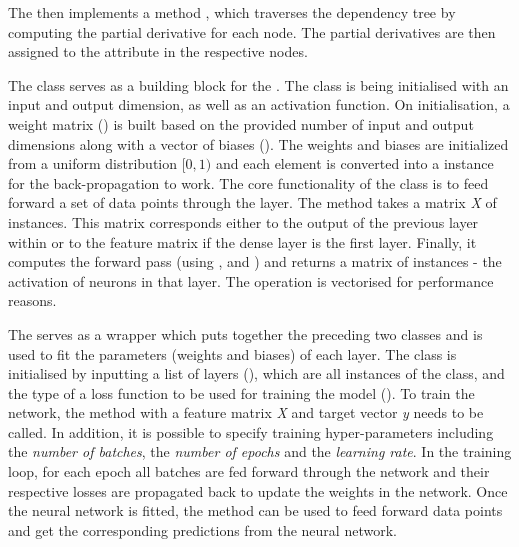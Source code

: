 The  then implements a method , which traverses the dependency tree by computing the partial derivative for each node. The partial derivatives are then assigned to the attribute  in the respective nodes.
\newline

The  class serves as a building block for the . The class is being initialised with an input and output dimension, as well as an activation function. On initialisation, a weight matrix () is built  based on the provided number of input and output dimensions along with a vector of biases (). The weights and biases are initialized from a uniform distribution $[0,1)$ and each element is converted into a  instance for the back-propagation to work. The core functionality of the  class is to feed forward a set of data points through the layer. The  method takes a matrix \textit{X} of  instances. This matrix corresponds either to the output of the previous layer within  or to the feature matrix if the dense layer is the first layer. Finally, it computes the forward pass (using ,  and ) and returns a matrix of  instances - the activation of neurons in that layer. The operation is vectorised for performance reasons.
\newline

The  serves as a wrapper which puts together the preceding two classes and is used to fit the parameters (weights and biases) of each layer. The class is initialised by inputting a list of layers (), which are all instances of the   class, and the type of a loss function to be used for training the model (). To train the network, the method  with a feature matrix \textit{X} and target vector \textit{y} needs to be called. In addition, it is possible to specify training hyper-parameters including the \textit{number of batches}, the \textit{number of epochs} and the \textit{learning rate}.  In the training loop, for each epoch all batches are fed forward through the network and their respective losses are propagated back to update the weights in the network. 
Once the neural network is fitted, the  method can be used to feed forward data points and get the corresponding predictions from the neural network.

